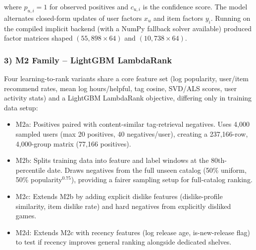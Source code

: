 \documentclass[conference]{IEEEtran}
\begin{document}
where $p_{u,i} = 1$ for observed positives and $c_{u,i}$ is the confidence score. The model alternates closed-form updates of user factors $x_u$ and item factors $y_i$. Running on the compiled implicit backend (with a NumPy fallback solver available) produced factor matrices shaped $(55,898 \times 64)$ and $(10,738 \times 64)$.

\subsubsection*{3) M2 Family -- LightGBM LambdaRank}

Four learning-to-rank variants share a core feature set (log popularity, user/item recommend rates, mean log hours/helpful, tag cosine, SVD/ALS scores, user activity stats) and a LightGBM LambdaRank objective, differing only in training data setup:

\begin{itemize}

\item M2a: Positives paired with content-similar tag-retrieval negatives. Uses 4,000 sampled users (max 20 positives, 40 negatives/user), creating a 237,166-row, 4,000-group matrix (77,166 positives).

\end{itemize}

\begin{itemize}

\item M2b: Splits training data into feature and label windows at the 80th-percentile date. Draws negatives from the full unseen catalog (50\% uniform, 50\% popularity$^{0.75}$), providing a fairer sampling setup for full-catalog ranking.

\end{itemize}

\begin{itemize}

\item M2c: Extends M2b by adding explicit dislike features (dislike-profile similarity, item dislike rate) and hard negatives from explicitly disliked games.

\end{itemize}

\begin{itemize}

\item M2d: Extends M2c with recency features (log release age, is-new-release flag) to test if recency improves general ranking alongside dedicated shelves.

\end{itemize}
\end{document}
